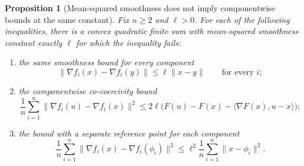 \documentclass{article}
\newtheorem{proposition}[theorem]{Proposition}
\theoremstyle{definition}
\begin{document}
\begin{proposition}[Mean-squared smoothness does not imply componentwise
bounds at the same constant]
\label{prop:ms-separators}
Fix $n\ge2$ and $\ell>0$.  For each of the following inequalities, there is a
convex quadratic finite sum with mean-squared smoothness constant exactly
$\ell$ for which the inequality fails:
\begin{enumerate}[label=(\roman*),leftmargin=*,itemsep=2pt,topsep=3pt]
    \item the same smoothness bound for every component
    \begin{equation}
        \|\nabla f_i(x)-\nabla f_i(y)\|
        \le \ell\|x-y\|
        \qquad\text{for every }i;
        \label{eq:false-samplewise-ms}
    \end{equation}
    \item the componentwise co-coercivity bound
    \begin{equation}
        \frac1n\sum_{i=1}^n
        \|\nabla f_i(u)-\nabla f_i(x)\|^2
        \le
        2\ell\bigl(F(u)-F(x)-\langle\nabla F(x),u-x\rangle\bigr);
        \label{eq:false-cocoercive-ms}
    \end{equation}
    \item the bound with a separate reference point for each component
    \begin{equation}
        \frac1n\sum_{i=1}^n
        \|\nabla f_i(x)-\nabla f_i(\phi_i)\|^2
        \le
        \ell^2\frac1n\sum_{i=1}^n\|x-\phi_i\|^2.
        \label{eq:false-multipair-ms}
    \end{equation}
\end{enumerate}
\end{proposition}
\end{document}
